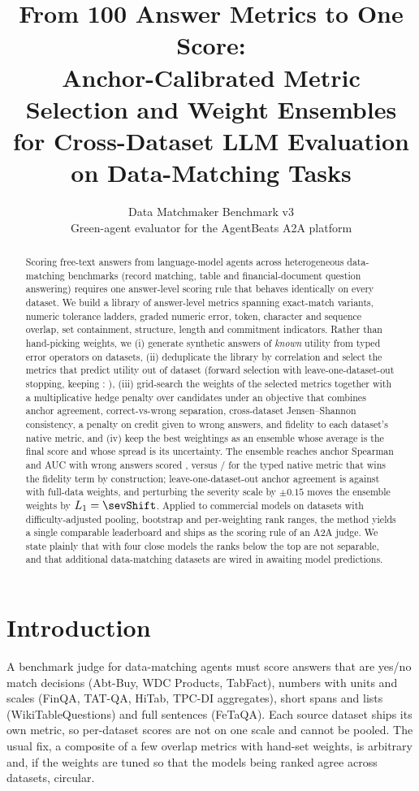 \documentclass[10pt,twocolumn]{article}
\title{\textbf{From 100 Answer Metrics to One Score:\\Anchor-Calibrated Metric Selection and Weight Ensembles for Cross-Dataset LLM Evaluation on Data-Matching Tasks}}
\author{Data Matchmaker Benchmark v3 \\ \small Green-agent evaluator for the AgentBeats A2A platform}
\date{}
\begin{document}
\maketitle
\begin{abstract}
Scoring free-text answers from language-model agents across heterogeneous data-matching benchmarks (record matching, table and financial-document question answering) requires one answer-level scoring rule that behaves identically on every dataset. We build a library of \nMetrics{} answer-level metrics spanning exact-match variants, numeric tolerance ladders, graded numeric error, token, character and sequence overlap, set containment, structure, length and commitment indicators. Rather than hand-picking weights, we (i) generate \nAnchors{} synthetic answers of \emph{known} utility from \nOps{} typed error operators on \nAnchorDatasets{} datasets, (ii) deduplicate the library by correlation and select the metrics that predict utility out of dataset (forward selection with leave-one-dataset-out stopping, keeping \kSel{}: \selList), (iii) grid-search the weights of the selected metrics together with a multiplicative hedge penalty over \nGrid{} candidates under an objective that combines anchor agreement, correct-vs-wrong separation, cross-dataset Jensen--Shannon consistency, a penalty on credit given to wrong answers, and fidelity to each dataset's native metric, and (iv) keep the \topK{} best weightings as an ensemble whose average is the final score and whose spread is its uncertainty. The ensemble reaches anchor Spearman \rhoEns{} and AUC \aucEns{} with wrong answers scored \badEns{}, versus \rhoNativeStyleMetric{} / \tauNatNativeStyleMetric{} for the typed native metric that wins the fidelity term by construction; leave-one-dataset-out anchor agreement is \lodoMeanLodo{} against \lodoMeanFull{} with full-data weights, and perturbing the severity scale by $\pm0.15$ moves the ensemble weights by $L_1=\sevShift$. Applied to \nModels{} commercial models on \nDatasets{} datasets with difficulty-adjusted pooling, bootstrap and per-weighting rank ranges, the method yields a single comparable leaderboard and ships as the scoring rule of an A2A judge. We state plainly that with four close models the ranks below the top are not separable, and that \nPendingDatasets{} additional data-matching datasets are wired in awaiting model predictions.
\end{abstract}

\section{Introduction}
A benchmark judge for data-matching agents must score answers that are yes/no match decisions (Abt-Buy, WDC Products, TabFact), numbers with units and scales (FinQA, TAT-QA, HiTab, TPC-DI aggregates), short spans and lists (WikiTableQuestions) and full sentences (FeTaQA). Each source dataset ships its own metric, so per-dataset scores are not on one scale and cannot be pooled. The usual fix, a composite of a few overlap metrics with hand-set weights, is arbitrary and, if the weights are tuned so that the models being ranked agree across datasets, circular.
\end{document}
